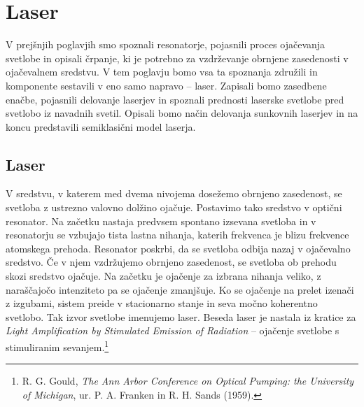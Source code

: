 
\chapter{Laser}

V prejšnjih poglavjih smo spoznali resonatorje, pojasnili proces ojačevanja svetlobe in 
opisali črpanje, ki je potrebno za vzdrževanje obrnjene zasedenosti v ojačevalnem sredstvu. 
V tem poglavju bomo vsa ta
spoznanja združili in komponente sestavili v eno samo napravo -- laser. Zapisali
bomo zasedbene enačbe, pojasnili delovanje laserjev in spoznali prednosti 
laserske svetlobe pred svetlobo iz navadnih svetil. Opisali bomo način delovanja 
sunkovnih laserjev in na koncu predstavili semiklasični model laserja. 

\section{Laser}
V sredstvu, v katerem med dvema nivojema dosežemo obrnjeno 
zasedenost, se svetloba z ustrezno valovno dolžino ojačuje. 
Postavimo tako sredstvo v optični resonator.  
Na začetku nastaja predvsem spontano izsevana svetloba in 
v resonatorju se vzbujajo tista lastna nihanja, katerih frekvenca je blizu frekvence
atomskega prehoda. Resonator poskrbi, da se svetloba odbija nazaj v ojačevalno 
sredstvo. Če v njem vzdržujemo obrnjeno zasedenost, se svetloba ob prehodu skozi 
sredstvo ojačuje.
Na začetku je ojačenje za
izbrana nihanja veliko, z naraščajočo intenziteto pa se ojačenje zmanjšuje.
Ko se ojačenje na prelet izenači z izgubami, sistem preide v stacionarno stanje in 
seva močno koherentno svetlobo. Tak
izvor svetlobe imenujemo laser. Beseda laser je nastala iz kratice za {\it Light
Amplification by Stimulated Emission of Radiation} --  ojačenje svetlobe s
stimuliranim sevanjem.\footnote{R. G. Gould, {\it The Ann Arbor Conference on Optical Pumping: 
the University of Michigan}, ur. P. A. Franken in R. H. Sands (1959).}

